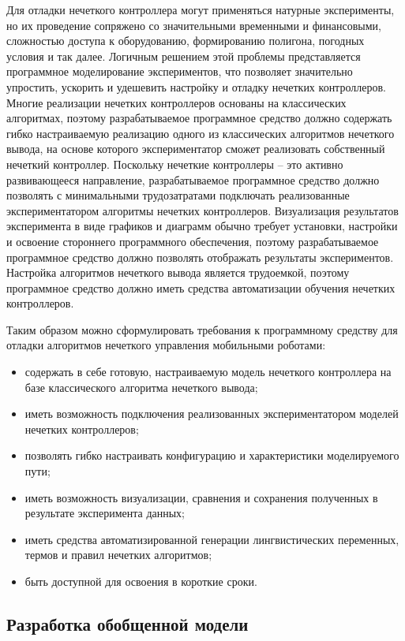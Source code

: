 Для отладки нечеткого контроллера могут применяться натурные эксперименты, но их проведение сопряжено со значительными временными и финансовыми, сложностью доступа к оборудованию, формированию полигона, погодных условия и так далее. Логичным решением этой проблемы представляется программное моделирование экспериментов, что позволяет значительно упростить, ускорить и удешевить настройку и отладку нечетких контроллеров. Многие реализации нечетких контроллеров основаны на классических алгоритмах, поэтому разрабатываемое программное средство должно содержать гибко настраиваемую реализацию одного из классических алгоритмов нечеткого вывода, на основе которого экспериментатор сможет реализовать собственный нечеткий контроллер. Поскольку нечеткие контроллеры – это активно развивающееся направление, разрабатываемое программное средство должно позволять с минимальными трудозатратами подключать реализованные экспериментатором алгоритмы нечетких контроллеров. Визуализация результатов эксперимента в виде графиков и диаграмм обычно требует установки, настройки и освоение стороннего программного обеспечения, поэтому разрабатываемое программное средство должно позволять отображать результаты экспериментов. Настройка алгоритмов нечеткого вывода является трудоемкой, поэтому программное средство должно иметь средства автоматизации обучения нечетких контроллеров.

Таким образом можно сформулировать требования к программному средству для отладки алгоритмов нечеткого управления мобильными роботами:

\begin{itemize}
  \item содержать в себе готовую, настраиваемую модель нечеткого контроллера на базе классического алгоритма нечеткого вывода;
  \item иметь возможность подключения реализованных экспериментатором моделей нечетких контроллеров;
  \item позволять гибко настраивать конфигурацию и характеристики моделируемого пути;
  \item иметь возможность визуализации, сравнения и сохранения полученных в результате эксперимента данных;
  \item иметь средства автоматизированной генерации лингвистических переменных, термов и правил нечетких алгоритмов;
  \item быть доступной для освоения в короткие сроки.
\end{itemize}

\subsection{Разработка обобщенной модели}
\label{sub:sys:2}

